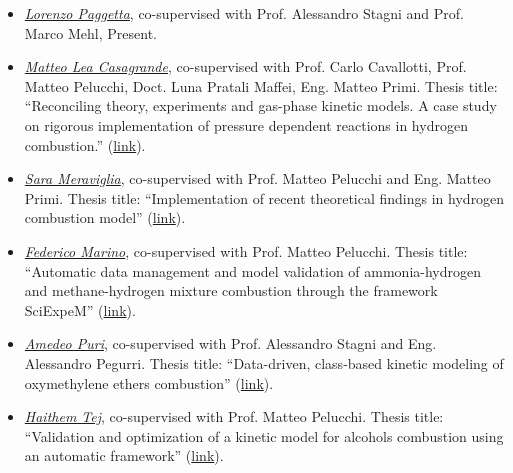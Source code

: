 
\begin{itemize}
   \item [ ] \ul{\it Lorenzo Paggetta}, co-supervised with Prof. Alessandro Stagni and
   Prof. Marco Mehl, Present.

   \item [ ] \ul{\it Matteo Lea Casagrande}, co-supervised with Prof. Carlo Cavallotti,
      Prof. Matteo Pelucchi, Doct. Luna Pratali Maffei, Eng. Matteo Primi. Thesis title:
      ``Reconciling theory, experiments and gas-phase kinetic models. A case study on
      rigorous implementation of pressure dependent reactions in hydrogen combustion.''
      (\href{https://hdl.handle.net/10589/226533}{link}).

   \item [ ] \ul{\it Sara Meraviglia}, co-supervised with Prof. Matteo Pelucchi and Eng.
      Matteo Primi. Thesis title: ``Implementation of recent theoretical findings in
      hydrogen combustion model'' (\href{https://hdl.handle.net/10589/214934}{link}).

   \item [ ] \ul{\it Federico Marino}, co-supervised with Prof. Matteo Pelucchi. Thesis
      title: ``Automatic data management and model validation of ammonia-hydrogen and
      methane-hydrogen mixture combustion through the framework SciExpeM''
      (\href{https://hdl.handle.net/10589/212616}{link}).

   \item [ ] \ul{\it Amedeo Puri}, co-supervised with Prof. Alessandro Stagni and Eng.
      Alessandro Pegurri. Thesis title: ``Data-driven, class-based kinetic modeling of
      oxymethylene ethers combustion'' (\href{https://hdl.handle.net/10589/206686}{link}).

   \item [ ] \ul{\it Haithem Tej}, co-supervised with Prof. Matteo Pelucchi. Thesis title:
      ``Validation and optimization of a kinetic model for alcohols combustion using an
      automatic framework'' (\href{https://hdl.handle.net/10589/210401}{link}).

\end{itemize}
